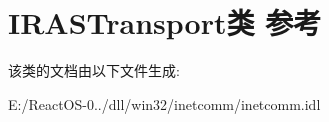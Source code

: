 \hypertarget{class_i_r_a_s_transport}{}\section{I\+R\+A\+S\+Transport类 参考}
\label{class_i_r_a_s_transport}


该类的文档由以下文件生成\+:\begin{DoxyCompactItemize}
\item 
E\+:/\+React\+O\+S-\/0../dll/win32/inetcomm/inetcomm.\+idl\end{DoxyCompactItemize}
